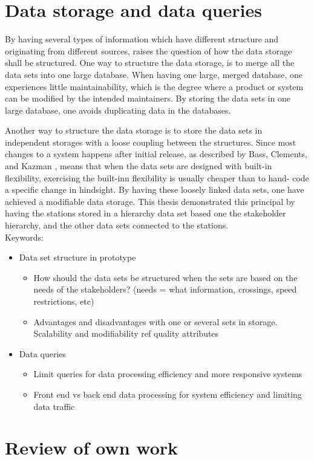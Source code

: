 \section{Data storage and data queries} %
\label{sec:discussion_data_storage_and_data_queries}
By having several types of information which have different structure and
originating from different sources, raises the question of how the data storage
shall be structured. One way to structure the data storage, is to merge all the
data sets into one large database. When having one large, merged 
database, one experiences little maintainability, which is the degree where a
product or system can be modified by the intended maintainers\cite[p. 195]{Bass:2012:SAP:2392670}.
By storing the data sets in one large database, one avoids duplicating data in
the databases.

Another way to structure the data storage is to store the data sets in
independent storages with a loose coupling between the structures. Since most 
changes to a system happens after initial release, as described by Bass, 
Clements, and Kazman \cite[pp. 117-124]{Bass:2012:SAP:2392670},
means that when the data sets are designed with built-in flexibility, 
exercising the built-inn flexibility is usually cheaper than to hand-
code a specific change in hindsight. By having these loosely linked data sets,
one have achieved a modifiable data storage. This thesis demonstrated this
principal by having the stations stored in a hierarchy data set based one the 
stakeholder hierarchy, and the other data sets connected to the stations.\\

Keywords:
\begin{itemize}
	\item Data set structure in prototype
	\begin{itemize}
		\item How should the data sets be structured when the sets are based on the needs of the stakeholders? (needs = what information, crossings, speed 
		restrictions, etc) 
		\item Advantages and disadvantages with one or several sets in storage.
		Scalability and modifiability ref quality attributes \cite{Bass:2012:SAP:2392670}
	\end{itemize}
	\item Data queries
	\begin{itemize}
		\item Limit queries for data processing efficiency 
		and more responsive systems
		\item Front end vs back end data processing for system efficiency and
		limiting data traffic
	\end{itemize}
\end{itemize}

\section{Review of own work} %
\label{sec:review_of_own_work}
